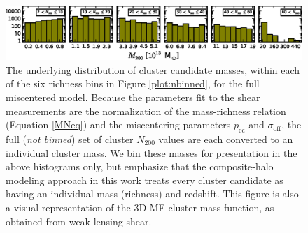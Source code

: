 \begin{figure}
\begin{center}
  \includegraphics[scale=1.0]{plots_ch4/m200panels_NoGaps.eps}
  \caption[Cluster Mass Distributions for each Richness Bin]{The underlying distribution of cluster candidate masses, within each of the six richness bins in Figure \ref{plot:nbinned}, for the full miscentered model. Because the parameters fit to the shear measurements are the normalization of the mass-richness relation (Equation \ref{MNeq}) and the miscentering parameters $p_{\mathrm{cc}}$ and $\sigma_{\mathrm{off}}$, the full ({\it not binned}) set of cluster $N_{200}$ values are each converted to an individual cluster mass. We bin these masses for presentation in the above histograms only, but emphasize that the composite-halo modeling approach in this work treats every cluster candidate as having an individual mass (richness) and redshift. This figure is also a visual representation of the \ac{3D-MF} cluster mass function, as obtained from weak lensing shear.}
\label{plot:multimass}
\end{center}
\end{figure}


